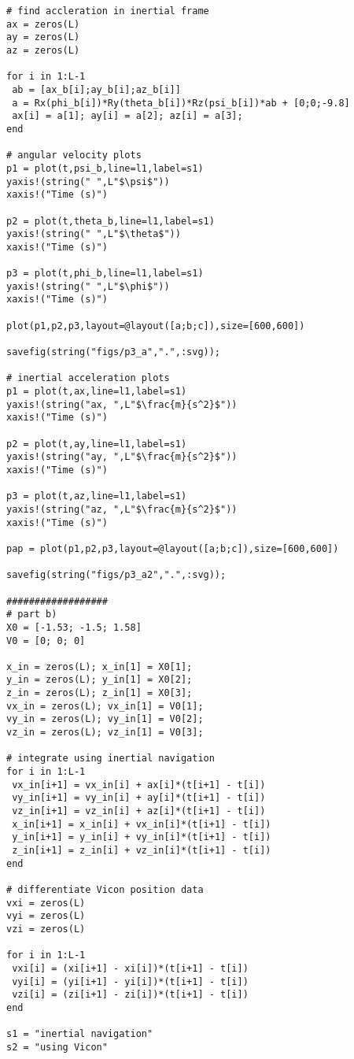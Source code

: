 \documentclass[paper=a4, fontsize=11pt]{scrartcl}
\numberwithin{equation}{section}		%
\numberwithin{figure}{section}			%
\numberwithin{table}{section}				%
\begin{document}
\begin{lstlisting}
# find accleration in inertial frame
ax = zeros(L)
ay = zeros(L)
az = zeros(L)

for i in 1:L-1
 ab = [ax_b[i];ay_b[i];az_b[i]]
 a = Rx(phi_b[i])*Ry(theta_b[i])*Rz(psi_b[i])*ab + [0;0;-9.8]
 ax[i] = a[1]; ay[i] = a[2]; az[i] = a[3];
end

# angular velocity plots
p1 = plot(t,psi_b,line=l1,label=s1)
yaxis!(string(" ",L"$\psi$"))
xaxis!("Time (s)")

p2 = plot(t,theta_b,line=l1,label=s1)
yaxis!(string(" ",L"$\theta$"))
xaxis!("Time (s)")

p3 = plot(t,phi_b,line=l1,label=s1)
yaxis!(string(" ",L"$\phi$"))
xaxis!("Time (s)")

plot(p1,p2,p3,layout=@layout([a;b;c]),size=[600,600])

savefig(string("figs/p3_a",".",:svg));

# inertial acceleration plots
p1 = plot(t,ax,line=l1,label=s1)
yaxis!(string("ax, ",L"$\frac{m}{s^2}$"))
xaxis!("Time (s)")

p2 = plot(t,ay,line=l1,label=s1)
yaxis!(string("ay, ",L"$\frac{m}{s^2}$"))
xaxis!("Time (s)")

p3 = plot(t,az,line=l1,label=s1)
yaxis!(string("az, ",L"$\frac{m}{s^2}$"))
xaxis!("Time (s)")

pap = plot(p1,p2,p3,layout=@layout([a;b;c]),size=[600,600])

savefig(string("figs/p3_a2",".",:svg));

##################
# part b)
X0 = [-1.53; -1.5; 1.58]
V0 = [0; 0; 0]

x_in = zeros(L); x_in[1] = X0[1];
y_in = zeros(L); y_in[1] = X0[2];
z_in = zeros(L); z_in[1] = X0[3];
vx_in = zeros(L); vx_in[1] = V0[1];
vy_in = zeros(L); vy_in[1] = V0[2];
vz_in = zeros(L); vz_in[1] = V0[3];

# integrate using inertial navigation
for i in 1:L-1
 vx_in[i+1] = vx_in[i] + ax[i]*(t[i+1] - t[i])
 vy_in[i+1] = vy_in[i] + ay[i]*(t[i+1] - t[i])
 vz_in[i+1] = vz_in[i] + az[i]*(t[i+1] - t[i])
 x_in[i+1] = x_in[i] + vx_in[i]*(t[i+1] - t[i])
 y_in[i+1] = y_in[i] + vy_in[i]*(t[i+1] - t[i])
 z_in[i+1] = z_in[i] + vz_in[i]*(t[i+1] - t[i])
end

# differentiate Vicon position data
vxi = zeros(L)
vyi = zeros(L)
vzi = zeros(L)

for i in 1:L-1
 vxi[i] = (xi[i+1] - xi[i])*(t[i+1] - t[i])
 vyi[i] = (yi[i+1] - yi[i])*(t[i+1] - t[i])
 vzi[i] = (zi[i+1] - zi[i])*(t[i+1] - t[i])
end

s1 = "inertial navigation"
s2 = "using Vicon"


\end{lstlisting}
\end{document}
